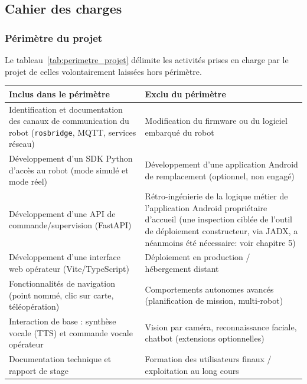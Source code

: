 \subsection{Cahier des charges}

\subsubsection{Périmètre du projet}

Le tableau~\ref{tab:perimetre_projet} délimite les activités prises en
charge par le projet de celles volontairement laissées hors périmètre.

\begin{center}
\begin{tabular}{|p{}|p{}|}
\hline
\textbf{Inclus dans le périmètre} & \textbf{Exclu du périmètre} \\
\hline
Identification et documentation des canaux de communication du robot
(\texttt{rosbridge}, MQTT, services réseau) &
Modification du firmware ou du logiciel embarqué du robot \\
\hline
Développement d'un SDK Python d'accès au robot (mode simulé et mode réel) &
Développement d'une application Android de remplacement (optionnel, non engagé) \\
\hline
Développement d'une API de commande/supervision (FastAPI) &
Rétro-ingénierie de la logique métier de l'application Android propriétaire
d'accueil (une inspection ciblée de l'outil de déploiement constructeur, via
JADX, a néanmoins été nécessaire: voir chapitre 5) \\
\hline
Développement d'une interface web opérateur (Vite/TypeScript) &
Déploiement en production / hébergement distant \\
\hline
Fonctionnalités de navigation (point nommé, clic sur carte, téléopération) &
Comportements autonomes avancés (planification de mission, multi-robot) \\
\hline
Interaction de base : synthèse vocale (TTS) et commande vocale opérateur &
Vision par caméra, reconnaissance faciale, chatbot (extensions optionnelles) \\
\hline
Documentation technique et rapport de stage &
Formation des utilisateurs finaux / exploitation au long cours \\
\hline
\end{tabular}
\label{tab:perimetre_projet}
\end{center}

